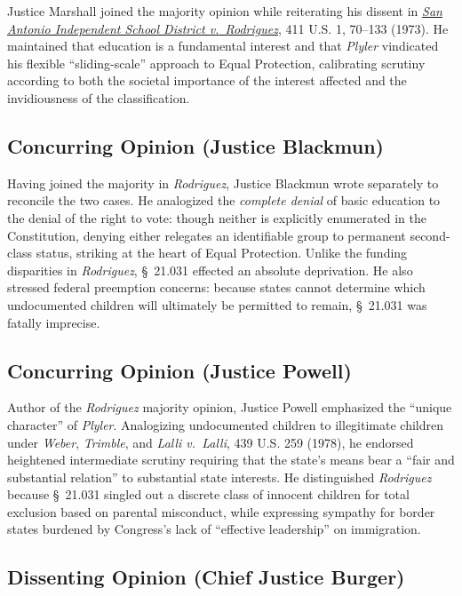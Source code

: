 \documentclass[12pt]{article}
\begin{document}
Justice Marshall joined the majority opinion while reiterating his dissent in \href{https://supreme.justia.com/cases/federal/us/411/1/}{\textit{San Antonio Independent School District v.\ Rodriguez}}, 411 U.S. 1, 70--133 (1973). He maintained that education is a fundamental interest and that \textit{Plyler} vindicated his flexible ``sliding-scale'' approach to Equal Protection, calibrating scrutiny according to both the societal importance of the interest affected and the invidiousness of the classification.

\subsection{Concurring Opinion (Justice Blackmun)}

Having joined the majority in \textit{Rodriguez}, Justice Blackmun wrote separately to reconcile the two cases. He analogized the \textit{complete denial} of basic education to the denial of the right to vote: though neither is explicitly enumerated in the Constitution, denying either relegates an identifiable group to permanent second-class status, striking at the heart of Equal Protection. Unlike the funding disparities in \textit{Rodriguez}, \S~21.031 effected an absolute deprivation. He also stressed federal preemption concerns: because states cannot determine which undocumented children will ultimately be permitted to remain, \S~21.031 was fatally imprecise.

\subsection{Concurring Opinion (Justice Powell)}

Author of the \textit{Rodriguez} majority opinion, Justice Powell emphasized the ``unique character'' of \textit{Plyler}. Analogizing undocumented children to illegitimate children under \textit{Weber}, \textit{Trimble}, and \textit{Lalli v.\ Lalli}, 439 U.S. 259 (1978), he endorsed heightened intermediate scrutiny requiring that the state's means bear a ``fair and substantial relation'' to substantial state interests. He distinguished \textit{Rodriguez} because \S~21.031 singled out a discrete class of innocent children for total exclusion based on parental misconduct, while expressing sympathy for border states burdened by Congress's lack of ``effective leadership'' on immigration.

\subsection{Dissenting Opinion (Chief Justice Burger)}
\end{document}
